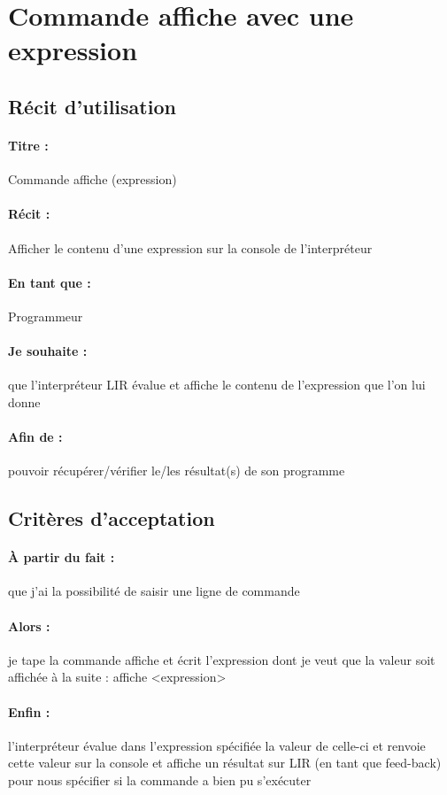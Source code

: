     \section{Commande affiche avec une expression}

	\subsection*{Récit d'utilisation}

	\paragraph{Titre : } Commande affiche (expression)
	\paragraph{Récit : }  Afficher le contenu d'une expression sur la console de l'interpréteur
	\paragraph{En tant que : } Programmeur
	\paragraph{Je souhaite : } que l'interpréteur LIR évalue et affiche le contenu de l'expression que l'on lui donne
	\paragraph{Afin de : } pouvoir récupérer/vérifier le/les résultat(s) de son programme

	\subsection*{Critères d'acceptation}

	\paragraph{À partir du fait : } que j'ai la possibilité de saisir une ligne de commande
	\paragraph{Alors : } je tape la commande affiche et écrit l'expression dont je veut que la valeur soit affichée à la suite : affiche <expression>
	\paragraph{Enfin : } l'interpréteur évalue dans l'expression spécifiée la valeur de celle-ci et renvoie cette valeur sur la console et affiche un résultat sur LIR (en tant que feed-back) pour nous spécifier si la commande a bien pu s'exécuter
